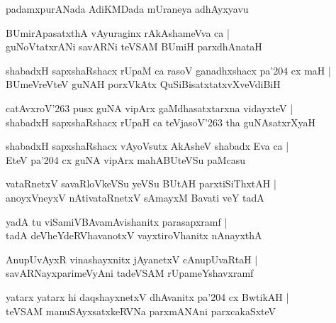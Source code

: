 \documentclass[twoside,12pt,openright]{book}
\newcounter{shloka}[chapter]
\begin{document}
\begin{center}
padamxpurANada AdiKMDada mUraneya adhAyxyavu
\end{center}

\begin{shloka}
BUmirApasatxthA vAyuraginx rAkAshameVva ca |\\
guNoVtatxrANi savARNi teVSAM BUmiH parxdhAnataH
\end{shloka}

\begin{shloka}
shabadxH sapxshaRshacx rUpaM ca rasoV ganadhxshacx pa\char'204 cx maH |\\
BUmeVreVteV guNAH porxVkAtx QuSiBisatxtatxvXveVdiBiH
\end{shloka}

\begin{shloka}
catAvxroV\char'263 pusx guNA vipArx gaMdhasatxtarxna vidayxteV |\\
shabadxH sapxshaRshacx rUpaH ca teVjasoV\char'263 tha guNAsatxrXyaH
\end{shloka}

\begin{shloka}
shabadxH sapxshaRshacx vAyoVsutx AkAsheV shabadx Eva ca |\\
EteV pa\char'204 cx guNA vipArx mahABUteVSu paMcasu
\end{shloka}

\begin{shloka}
vataRnetxV savaRloVkeVSu yeVSu BUtAH parxtiSiThxtAH |\\
anoyxVneyxV nAtivataRnetxV sAmayxM Bavati veY tadA
\end{shloka}

\begin{shloka}
yadA tu viSamiVBAvamAvishanitx parasapxramf |\\
tadA deVheYdeRVhavanotxV vayxtiroVhanitx nAnayxthA
\end{shloka}

\begin{shloka}
AnupUvAyxR vinashayxnitx jAyanetxV cAnupUvaRtaH  |\\
savARNayxparimeVyAni tadeVSAM rUpameYshavxramf
\end{shloka}

\begin{shloka}
yatarx yatarx hi daqshayxnetxV dhAvanitx pa\char'204 cx BwtikAH |\\
teVSAM manuSAyxsatxkeRVNa parxmANAni parxcakaSxteV
\end{shloka}
\end{document}
